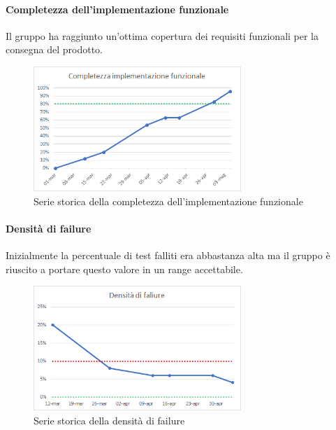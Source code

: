     \paragraph{Completezza dell'implementazione funzionale} \Spazio
    Il gruppo ha raggiunto un'ottima copertura dei requisiti funzionali per la consegna del prodotto.
    \begin{figure}[H]
    	\centering 
    	\includegraphics[width=0.7\textwidth]{Images/completezza-funzionale.png}
    	\caption{Serie storica della completezza dell'implementazione funzionale}
    	\label{cf} 
    \end{figure}
     \paragraph{Densità di failure} \Spazio
    Inizialmente la percentuale di test falliti era abbastanza alta ma il gruppo è riuscito a portare questo valore in un range accettabile.
    \begin{figure}[H]
    	\centering 
    	\includegraphics[width=0.7\textwidth]{Images/fail.png}
    	\caption{Serie storica della densità di failure}
    	\label{fail} 
    \end{figure} 
